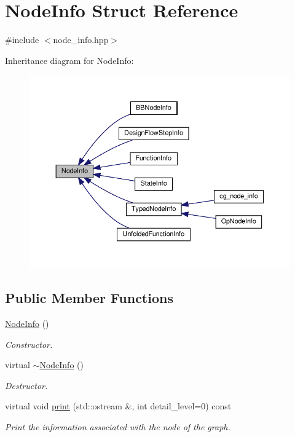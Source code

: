 \hypertarget{structNodeInfo}{}\section{Node\+Info Struct Reference}
\label{structNodeInfo}


{\ttfamily \#include $<$node\+\_\+info.\+hpp$>$}



Inheritance diagram for Node\+Info\+:
\nopagebreak
\begin{figure}[H]
\begin{center}
\leavevmode
\includegraphics[width=350pt]{d2/ddc/structNodeInfo__inherit__graph}
\end{center}
\end{figure}
\subsection*{Public Member Functions}
\begin{DoxyCompactItemize}
\item 
\hyperlink{structNodeInfo_afef392e4c27930503179a6ed868a53dd}{Node\+Info} ()
\begin{DoxyCompactList}\small\item\em Constructor. \end{DoxyCompactList}\item 
virtual \hyperlink{structNodeInfo_a1543255862f1a3dbc456d1113c0c8f49}{$\sim$\+Node\+Info} ()
\begin{DoxyCompactList}\small\item\em Destructor. \end{DoxyCompactList}\item 
virtual void \hyperlink{structNodeInfo_adacfeaff90018a35bde5211edbbd1114}{print} (std\+::ostream \&, int detail\+\_\+level=0) const
\begin{DoxyCompactList}\small\item\em Print the information associated with the node of the graph. \end{DoxyCompactList}\end{DoxyCompactItemize}

